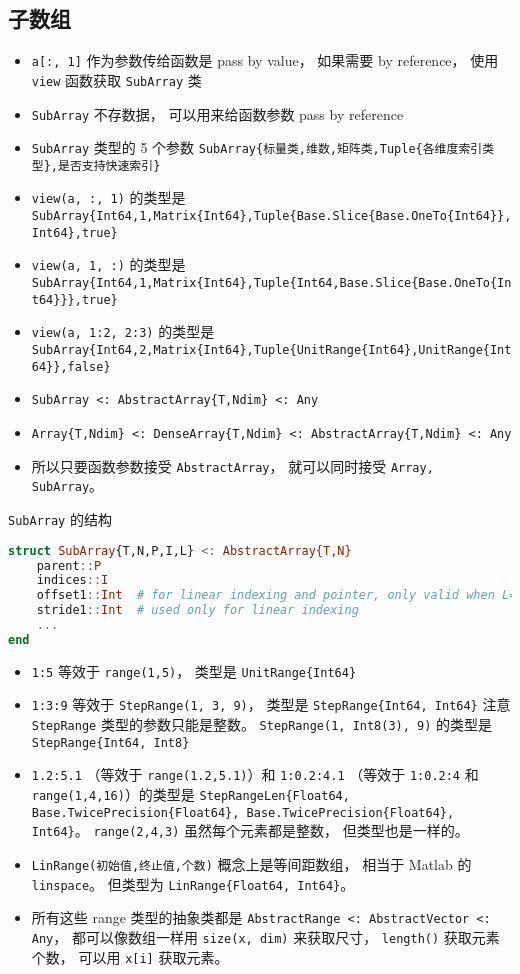 \subsection{子数组}
\begin{itemize}
\item \verb|a[:, 1]| 作为参数传给函数是 pass by value， 如果需要 by reference， 使用 \verb|view| 函数获取 \verb|SubArray| 类
\item \verb|SubArray| 不存数据， 可以用来给函数参数 pass by reference
\item \verb|SubArray| 类型的 5 个参数 \verb|SubArray{标量类,维数,矩阵类,Tuple{各维度索引类型},是否支持快速索引}|
\item \verb|view(a, :, 1)| 的类型是 \verb|SubArray{Int64,1,Matrix{Int64},Tuple{Base.Slice{Base.OneTo{Int64}},Int64},true}|
\item \verb|view(a, 1, :)| 的类型是 \verb|SubArray{Int64,1,Matrix{Int64},Tuple{Int64,Base.Slice{Base.OneTo{Int64}}},true}|
\item \verb|view(a, 1:2, 2:3)| 的类型是 \verb|SubArray{Int64,2,Matrix{Int64},Tuple{UnitRange{Int64},UnitRange{Int64}},false}|
\item \verb|SubArray <: AbstractArray{T,Ndim} <: Any|
\item \verb|Array{T,Ndim} <: DenseArray{T,Ndim} <: AbstractArray{T,Ndim} <: Any|
\item 所以只要函数参数接受 \verb|AbstractArray|， 就可以同时接受 \verb|Array, SubArray|。
\end{itemize}

\verb|SubArray| 的结构
\begin{lstlisting}[language=julia]
struct SubArray{T,N,P,I,L} <: AbstractArray{T,N}
    parent::P
    indices::I
    offset1::Int  # for linear indexing and pointer, only valid when L==true
    stride1::Int  # used only for linear indexing
    ...
end
\end{lstlisting}

\begin{itemize}
\item \verb|1:5| 等效于 \verb|range(1,5)|， 类型是 \verb|UnitRange{Int64}|
\item \verb|1:3:9| 等效于 \verb|StepRange(1, 3, 9)|， 类型是 \verb|StepRange{Int64, Int64}| 注意 \verb|StepRange| 类型的参数只能是整数。 \verb|StepRange(1, Int8(3), 9)| 的类型是 \verb|StepRange{Int64, Int8}|
\item \verb|1.2:5.1| （等效于 \verb|range(1.2,5.1)|）和 \verb|1:0.2:4.1| （等效于 \verb|1:0.2:4| 和 \verb|range(1,4,16)|）的类型是 \verb|StepRangeLen{Float64, Base.TwicePrecision{Float64}, Base.TwicePrecision{Float64}, Int64}|。 \verb|range(2,4,3)| 虽然每个元素都是整数， 但类型也是一样的。
\item \verb|LinRange(初始值,终止值,个数)| 概念上是等间距数组， 相当于 Matlab 的 \verb|linspace|。 但类型为 \verb|LinRange{Float64, Int64}|。
\item 所有这些 range 类型的抽象类都是 \verb|AbstractRange <: AbstractVector <: Any|， 都可以像数组一样用 \verb|size(x, dim)| 来获取尺寸， \verb|length()| 获取元素个数， 可以用 \verb|x[i]| 获取元素。
\end{itemize}


